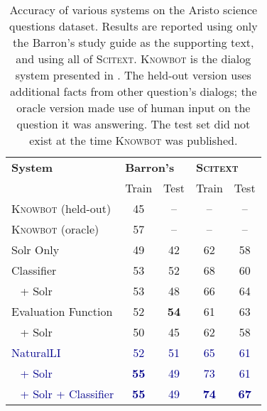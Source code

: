 %
%
\def\t#1{\small{#1}}
\def\b#1{\t{\textbf{#1}}}
\def\m#1{\t{\textcolor{darkblue}{#1}}}
\def\c#1{\b{\textcolor{darkblue}{#1}}}
\def\colspaceS{2.0mm}
\def\colspaceM{3.0mm}
\def\colspaceL{5.0mm}

\begin{table}
\begin{center}
\begin{tabular}{l@{\hskip \colspaceL}c@{\hskip \colspaceS}c@{\hskip \colspaceL}c@{\hskip \colspaceS}c}
\hline
\textbf{System} & \multicolumn{2}{l}{\textbf{Barron's}} & \multicolumn{2}{l}{\textbf{\textsc{Scitext}}} \\
 & Train & Test & Train & Test \\     %
\hline                            %
\t{\textsc{Knowbot} (held-out)} & \t{45}  & \t{--}   & \t{--}  & \t{--} \\
\t{\textsc{Knowbot} (oracle)}   & \t{57}  & \t{--}   & \t{--}  & \t{--} \\
\hline                                                           
\t{Solr Only}                   & \t{49}  & \t{42}   & \t{62}  & \t{58} \\
\t{Classifier}                  & \t{53}  & \t{52}   & \t{68}  & \t{60} \\
\t{$~~$ + Solr}                 & \t{53}  & \t{48}   & \t{66}  & \t{64} \\
\hline                                                           
\t{Evaluation Function}         & \t{52}  & \b{54}   & \t{61}  & \t{63} \\
\t{$~~$ + Solr}                 & \t{50}  & \t{45}   & \t{62}  & \t{58} \\
\m{NaturalLI}                   & \m{52}  & \m{51}   & \m{65}  & \m{61} \\
\m{$~~$ + Solr}                 & \c{55}  & \m{49}   & \m{73}  & \m{61} \\
\m{$~~$ + Solr + Classifier}    & \c{55}  & \m{49}   & \c{74}  & \c{67} \\
\hline
\end{tabular}
\end{center}
\caption{
\label{tab:aristonaturalli}
Accuracy of various systems on the Aristo science questions dataset.
Results are reported using only the Barron's study guide as the supporting
  text, and using all of \textsc{Scitext}.
\textsc{Knowbot} is the dialog system presented in .
The held-out version uses additional facts from other question's dialogs;
  the oracle version made use of human input on the question it was 
  answering.
The test set did not exist at the time \textsc{Knowbot} was published.
}
\end{table}


